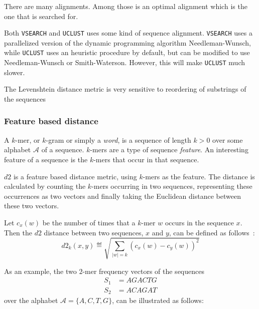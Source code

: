 There are many alignments. Among those is an optimal alignment which is the one
that is searched for.

Both \texttt{VSEARCH} and \texttt{UCLUST} uses some kind of sequence alignment.
\texttt{VSEARCH} uses a parallelized version of the dynamic programming
algorithm Needleman-Wunsch, while \texttt{UCLUST} uses an heuristic procedure
by default, but can be modified to use Needleman-Wunsch or Smith-Waterson.
However, this will make \texttt{UCLUST} much slower.


The Levenshtein distance metric is very sensitive to reordering of substrings
of the sequences %


\subsubsection{Feature based distance}

A $k$-mer, or $k$-gram or simply a \emph{word}, is a sequence of length
$k > 0$ over some alphabet $\mathcal{A}$ of a sequence. $k$-mers are a type
of sequence \emph{feature}. An interesting feature of a sequence is the
$k$-mers that occur in that sequence.

$d2$ is a feature based distance metric, using $k$-mers as the feature. The
distance is calculated by counting the $k$-mers occurring in two sequences,
representing these occurrences as two vectors and finally taking the Euclidean
distance between these two vectors.~\cite[pp.~53-54]{dong}

Let $c_x(w)$ be the number of times that a $k$-mer $w$ occurs in the sequence
$x$. Then the $d2$ distance between two sequences, $x$ and $y$, can be defined
as follows~\cite[pp.~1-2]{hazelhurst}:
\begin{equation}
  d2_k(x,y) \eqdef \sqrt{\sum_{|w|=k} (c_x(w) - c_y(w))^2}
\end{equation}

As an example, the two $2$-mer frequency vectors of the sequences
\begin{align*}
  S_1 &= AGACTG \\
  S_2 &= ACAGAT
\end{align*}
over the alphabet $\mathcal{A} = \{A,C,T,G\}$, can be illustrated as follows:

\begin{table}[!h]
\centering
{}
\end{table}

